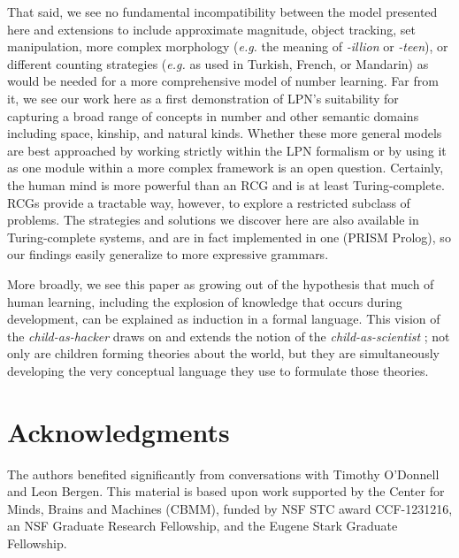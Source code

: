 \documentclass[10pt,letterpaper]{article}
\begin{document}
That said, we see no fundamental incompatibility between the model
presented here and extensions to include approximate magnitude, object
tracking, set manipulation, more complex morphology ({\it e.g.} the
meaning of \emph{-illion} or \emph{-teen}), or different counting
strategies ({\it e.g.} as used in Turkish, French, or Mandarin) as
would be needed for a more comprehensive model of number learning. Far
from it, we see our work here as a first demonstration of LPN's
suitability for capturing a broad range of concepts in number and
other semantic domains including space, kinship, and natural kinds.
Whether these more general models are best approached by working
strictly within the LPN formalism or by using it as one module within
a more complex framework is an open question. Certainly, the human
mind is more powerful than an RCG and is at least Turing-complete.
RCGs provide a tractable way, however, to explore a restricted
subclass of problems. The strategies and solutions we discover here
are also available in Turing-complete systems, and are in fact
implemented in one (PRISM Prolog), so our findings easily generalize
to more expressive grammars.

More broadly, we see this paper as growing out of the hypothesis that
much of human learning, including the explosion of knowledge that
occurs during development, can be explained as induction in a formal
language. This vision of the \emph{child-as-hacker} draws on and
extends the notion of the \emph{child-as-scientist} \citep{gopnik1996scientist}; not only are
children forming theories about the world, but they are simultaneously
developing the very conceptual language they use to formulate those
theories.

\section{Acknowledgments}

The authors benefited significantly from conversations with Timothy
O'Donnell and Leon Bergen. This material is based upon work supported
by the Center for Minds, Brains and Machines (CBMM), funded by NSF STC
award CCF-1231216, an NSF Graduate Research Fellowship, and the Eugene
Stark Graduate Fellowship.




\setlength{\bibleftmargin}{.125in}
\setlength{\bibindent}{-\bibleftmargin}

\end{document}
